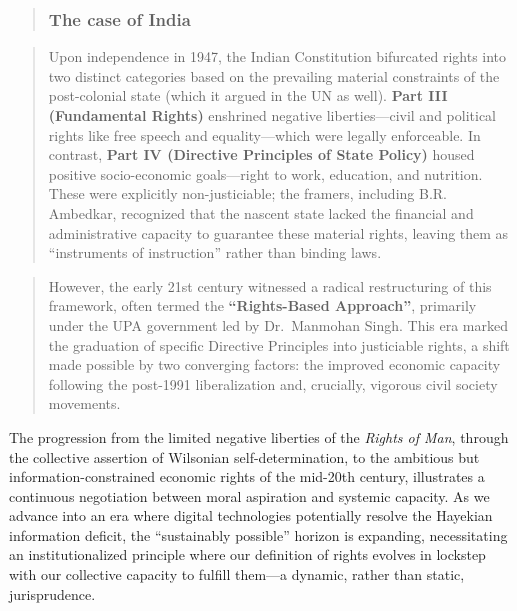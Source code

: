 \begin{quote}
\subsubsection{The case of India}\label{the-case-of-india}
\end{quote}

\begin{quote}
Upon independence in 1947, the Indian Constitution bifurcated rights
into two distinct categories based on the prevailing material
constraints of the post-colonial state (which it argued in the UN as
well). \textbf{Part III (Fundamental Rights)} enshrined negative
liberties---civil and political rights like free speech and
equality---which were legally enforceable. In contrast, \textbf{Part IV
(Directive Principles of State Policy)} housed positive socio-economic
goals---right to work, education, and nutrition. These were explicitly
non-justiciable; the framers, including B.R. Ambedkar, recognized that
the nascent state lacked the financial and administrative capacity to
guarantee these material rights, leaving them as ``instruments of
instruction'' rather than binding laws.
\end{quote}

\begin{quote}
However, the early 21st century witnessed a radical restructuring of
this framework, often termed the \textbf{``Rights-Based Approach''},
primarily under the UPA government led by Dr.~Manmohan Singh. This era
marked the graduation of specific Directive Principles into justiciable
rights, a shift made possible by two converging factors: the improved
economic capacity following the post-1991 liberalization and, crucially,
vigorous civil society movements.
\end{quote}

The progression from the limited negative liberties of the \emph{Rights
of Man}, through the collective assertion of Wilsonian
self-determination, to the ambitious but information-constrained
economic rights of the mid-20th century, illustrates a continuous
negotiation between moral aspiration and systemic capacity. As we
advance into an era where digital technologies potentially resolve the
Hayekian information deficit, the ``sustainably possible'' horizon is
expanding, necessitating an institutionalized principle where our
definition of rights evolves in lockstep with our collective capacity to
fulfill them---a dynamic, rather than static, jurisprudence.

